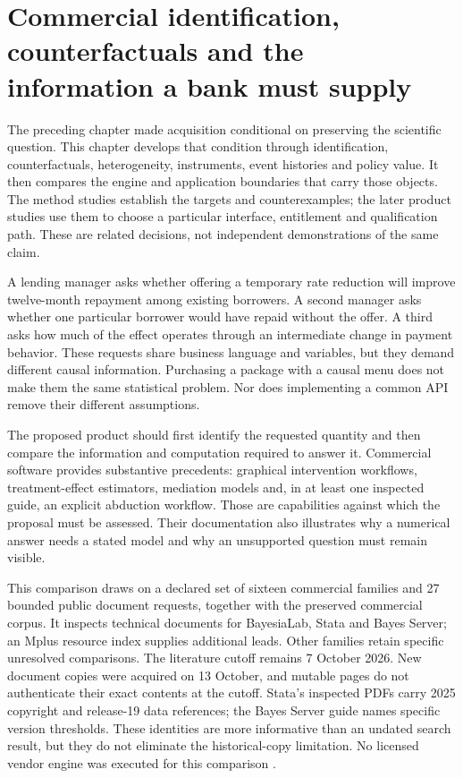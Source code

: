 \chapter{Commercial identification, counterfactuals and the information a bank must supply}
\label{exec13:commercial-identification}

The preceding chapter made acquisition conditional on preserving the scientific
question. This chapter develops that condition through identification,
counterfactuals, heterogeneity, instruments, event histories and policy value.
It then compares the engine and application boundaries that carry those objects.
The method studies establish the targets and counterexamples; the later
product studies use them to choose a particular interface, entitlement and
qualification path. These are related decisions, not independent demonstrations
of the same claim.

A lending manager asks whether offering a temporary rate reduction will improve
twelve-month repayment among existing borrowers. A second manager asks whether
one particular borrower would have repaid without the offer. A third asks how
much of the effect operates through an intermediate change in payment behavior.
These requests share business language and variables, but they demand different
causal information. Purchasing a package with a causal menu does not make them
the same statistical problem. Nor does implementing a common API remove their
different assumptions.

The proposed product should first identify the requested quantity and then
compare the information and computation required to answer it. Commercial
software provides substantive precedents: graphical intervention workflows,
treatment-effect estimators, mediation models and, in at least one inspected
guide, an explicit abduction workflow. Those are capabilities against which the
proposal must be assessed. Their documentation also illustrates why a numerical
answer needs a stated model and why an unsupported question must remain visible.

This comparison draws on a declared set of sixteen commercial families and
27 bounded public document requests, together with the preserved commercial
corpus. It inspects technical documents for BayesiaLab, Stata and Bayes Server;
an Mplus resource index supplies additional leads. Other families retain
specific unresolved comparisons. The literature cutoff remains 7 October 2026.
New document copies were acquired on 13 October, and mutable pages do not
authenticate their exact contents at the cutoff. Stata's inspected PDFs carry
2025 copyright and release-19 data references; the Bayes Server guide names
specific version thresholds. These identities are more informative than an
undated search result, but they do not eliminate the historical-copy limitation.
No licensed vendor engine was executed for this comparison
\citep{exec13_ci_scope}.

